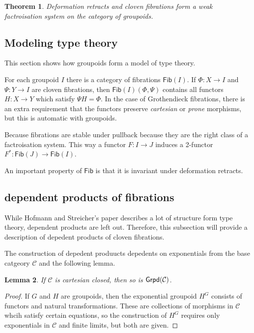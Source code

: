 \documentclass{amsart}
\theoremstyle{plain}
\newtheorem{theorem}{Theorem}
\newtheorem{lemma}[theorem]{Lemma}
\theoremstyle{definition}
\newcommand\cat\mathcal
\begin{document}
\begin{theorem} Deformation retracts and cloven fibrations form a weak factroisation system on the category of groupoids. \end{theorem}








\newcommand\fib{\mathsf{Fib}}
\newcommand\pb{^*}
\subsection{Modeling type theory}
This section shows how groupoids form a model of type theory.

For each groupoid $I$ there is a category of fibrations $\fib(I)$. If $\Phi:X\to I$ and $\Psi:Y\to I$ are cloven fibrations, then $\fib(I)(\Phi,\Psi)$ contains all functors $H:X\to Y$ which satisfy $\Psi H=\Phi$. In the case of Grothendieck fibrations, there is an extra requirement that the functors preserve \emph{cartesian} or \emph{prone} morphisms, but this is automatic with groupoids.

Because fibrations are stable under pullback because they are the right class of a factroisation system. This way a functor $F:I\to J$ induces a 2-functor $F^*:\fib(J) \to \fib (I)$.

An important property of $\fib$ is that it is invariant under deformation retracts.




\subsection{dependent products of fibrations}
While Hofmann and Streicher's paper describes a lot of structure form type theory, dependent products are left out. Therefore, this subsection will provide a description of depedent products of cloven fibrations.

The construction of depedent produucts depedents on exponentials from the base catgeory $\cat C$ and the following lemma.

\begin{lemma} If $\cat C$ is cartesian closed, then so is $\grpd(\cat C)$. \end{lemma}

\begin{proof} If $G$ and $H$ are groupoids, then the exponential groupoid $H^G$ consists of functors and natural transformations. These are collections of morphisms in $\cat C$ whcih satisfy certain equations, so the construction of $H^G$ requires only exponentials in $\cat C$ and finite limits, but both are given. \end{proof}
\end{document}
